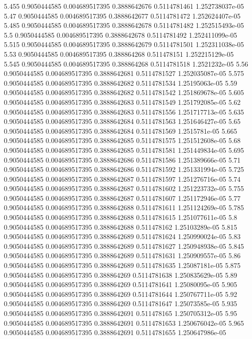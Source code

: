 {5.455 0.9050444585 0.004689517395 0.3888642676 0.5114781461 1.252738037e-05
5.47 0.9050444585 0.004689517395 0.3888642677 0.5114781472 1.252624407e-05
5.485 0.9050444585 0.004689517395 0.3888642678 0.5114781482 1.252515493e-05
5.5 0.9050444585 0.004689517395 0.3888642678 0.5114781492 1.252411099e-05
5.515 0.9050444585 0.004689517395 0.3888642679 0.5114781501 1.252311038e-05
5.53 0.9050444585 0.004689517395 0.388864268 0.511478151 1.252215129e-05
5.545 0.9050444585 0.004689517395 0.388864268 0.5114781518 1.2521232e-05
5.56 0.9050444585 0.004689517395 0.3888642681 0.5114781527 1.252035087e-05
5.575 0.9050444585 0.004689517395 0.3888642682 0.5114781534 1.25195063e-05
5.59 0.9050444585 0.004689517395 0.3888642682 0.5114781542 1.251869678e-05
5.605 0.9050444585 0.004689517395 0.3888642683 0.5114781549 1.251792085e-05
5.62 0.9050444585 0.004689517395 0.3888642683 0.5114781556 1.251717713e-05
5.635 0.9050444585 0.004689517395 0.3888642684 0.5114781563 1.251646427e-05
5.65 0.9050444585 0.004689517395 0.3888642684 0.5114781569 1.2515781e-05
5.665 0.9050444585 0.004689517395 0.3888642685 0.5114781575 1.251512608e-05
5.68 0.9050444585 0.004689517395 0.3888642685 0.5114781581 1.251449834e-05
5.695 0.9050444585 0.004689517395 0.3888642686 0.5114781586 1.251389666e-05
5.71 0.9050444585 0.004689517395 0.3888642686 0.5114781592 1.251331994e-05
5.725 0.9050444585 0.004689517395 0.3888642687 0.5114781597 1.251276716e-05
5.74 0.9050444585 0.004689517395 0.3888642687 0.5114781602 1.251223732e-05
5.755 0.9050444585 0.004689517395 0.3888642687 0.5114781607 1.251172946e-05
5.77 0.9050444585 0.004689517395 0.3888642688 0.5114781611 1.251124269e-05
5.785 0.9050444585 0.004689517395 0.3888642688 0.5114781615 1.251077611e-05
5.8 0.9050444585 0.004689517395 0.3888642688 0.511478162 1.25103289e-05
5.815 0.9050444585 0.004689517395 0.3888642689 0.5114781624 1.250990024e-05
5.83 0.9050444585 0.004689517395 0.3888642689 0.5114781627 1.250948938e-05
5.845 0.9050444585 0.004689517395 0.3888642689 0.5114781631 1.250909557e-05
5.86 0.9050444585 0.004689517395 0.3888642689 0.5114781635 1.25087181e-05
5.875 0.9050444585 0.004689517395 0.388864269 0.5114781638 1.250835629e-05
5.89 0.9050444585 0.004689517395 0.388864269 0.5114781641 1.25080095e-05
5.905 0.9050444585 0.004689517395 0.388864269 0.5114781644 1.250767711e-05
5.92 0.9050444585 0.004689517395 0.388864269 0.5114781647 1.25073585e-05
5.935 0.9050444585 0.004689517395 0.3888642691 0.511478165 1.250705312e-05
5.95 0.9050444585 0.004689517395 0.3888642691 0.5114781653 1.250676042e-05
5.965 0.9050444585 0.004689517395 0.3888642691 0.5114781655 1.250647986e-05
}
